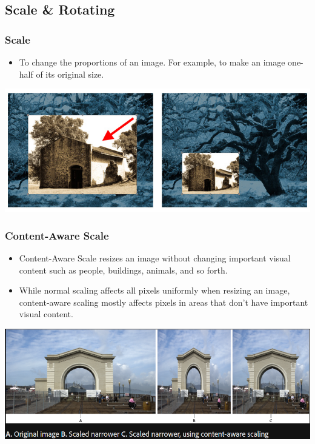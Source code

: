 \documentclass{beamer}
\begin{document}
		\subsection{Scale \& Rotating}
\begin{frame}
	\frametitle{Scale}
	\begin{itemize}
		\item To change the proportions of an image. For example, to make an image one-half of its original size.
	\end{itemize}
	\begin{center}
		\includegraphics[width = 1.0\textwidth]{images/scale_PS.jpg}
	\end{center}
\end{frame}

\begin{frame}
	\frametitle{Content-Aware Scale}
	\begin{itemize}
		\item Content-Aware Scale resizes an image without changing important visual content such as people, buildings, animals, and so forth.
		\item While normal scaling affects all pixels uniformly when resizing an image, content-aware scaling mostly affects pixels in areas that don’t have important visual content.
	\end{itemize}
	\begin{center}
		\includegraphics[width = 1.0\textwidth]{images/content aware scale.png}
	\end{center}
\end{frame}
\end{document}
